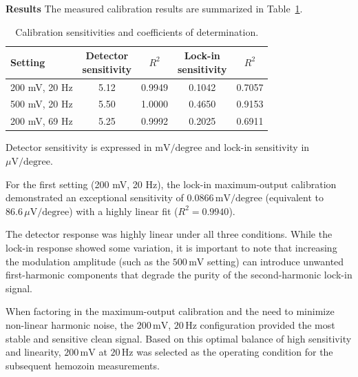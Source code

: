 \documentclass[12pt,a4paper]{article}
\begin{document}
\textbf{Results}
The measured calibration results are summarized in Table~\ref{tab:calibration}.

\begin{table}[H]
\centering
\caption{Calibration sensitivities and coefficients of determination.}
\label{tab:calibration}
\begin{tabular}{lcccc}
\hline
Setting &
\shortstack{Detector\\sensitivity} &
\(R^2\) &
\shortstack{Lock-in\\sensitivity} &
\(R^2\) \\
\hline
200 mV, 20 Hz & 5.12 & 0.9949 & 0.1042 & 0.7057 \\
500 mV, 20 Hz & 5.50 & 1.0000 & 0.4650 & 0.9153 \\
200 mV, 69 Hz & 5.25 & 0.9992 & 0.2025 & 0.6911 \\
\hline
\end{tabular}

\vspace{2mm}
\footnotesize
Detector sensitivity is expressed in \(\mathrm{mV/degree}\) and lock-in
sensitivity in \(\mu\mathrm{V/degree}\).
\end{table}

For the first setting (200 mV, 20 Hz), the lock-in maximum-output calibration demonstrated an exceptional sensitivity of \(0.0866\,\mathrm{mV/degree}\) (equivalent to \(86.6\,\mu\mathrm{V/degree}\)) with a highly linear fit (\(R^2=0.9940\)).

The detector response was highly linear under all three conditions. While the lock-in response showed some variation, it is important to note that increasing the modulation amplitude (such as the \(500\,\mathrm{mV}\) setting) can introduce unwanted first-harmonic components that degrade the purity of the second-harmonic lock-in signal. 

When factoring in the maximum-output calibration and the need to minimize non-linear harmonic noise, the \(200\,\mathrm{mV}\), \(20\,\mathrm{Hz}\) configuration provided the most stable and sensitive clean signal. Based on this optimal balance of high sensitivity and linearity, \(200\,\mathrm{mV}\) at \(20\,\mathrm{Hz}\) was selected as the operating condition for the subsequent hemozoin measurements.
\end{document}
